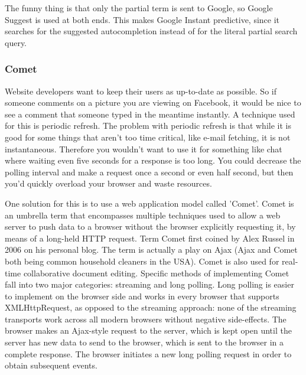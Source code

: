 The funny thing is that only the partial term is sent to Google, so Google Suggest is used at both ends. This makes Google Instant predictive, since it searches for the suggested autocompletion instead of for the literal partial search query.\\
	
\subsubsection{Comet}
Website developers want to keep their users as up-to-date as possible. So if someone comments on a picture you are viewing on Facebook, it would be nice to see a comment that someone typed in the meantime instantly. A technique used for this is periodic refresh. The problem with periodic refresh is that while it is good for some things that aren't too time critical, like e-mail fetching, it is not instantaneous. Therefore you wouldn't want to use it for something like chat where waiting even five seconds for a response is too long. You could decrease the polling interval and make a request once a second or even half second, but then you'd quickly overload your browser and waste resources.	
	
One solution for this is to use a web application model called 'Comet'. Comet is an umbrella term that encompasses multiple techniques  used to allow a web server to push data to a browser without the browser explicitly requesting it, by means of a long-held HTTP request. Term Comet first coined by Alex Russel in 2006 on his personal blog. The term is actually a play on Ajax (Ajax and Comet both being common household cleaners in the USA). Comet is also used for real-time collaborative document editing. Specific methods of implementing Comet fall into two major categories: streaming and long polling. Long polling is easier to implement on the browser side and works in every browser that supports XMLHttpRequest, as opposed to the streaming approach: none of the streaming transports work across all modern browsers without negative side-effects. The browser makes an Ajax-style request to the server, which is kept open until the server has new data to send to the browser, which is sent to the browser in a complete response. The browser initiates a new long polling request in order to obtain subsequent events.